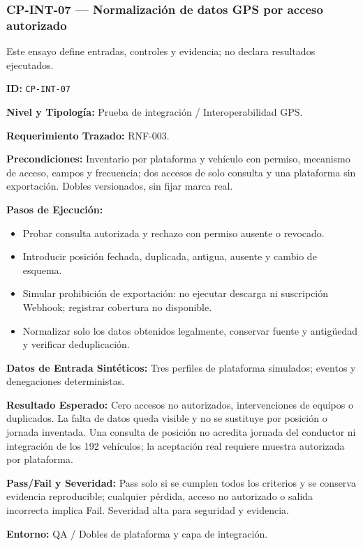 \subsubsection*{CP-INT-07 — Normalización de datos GPS por acceso autorizado}\label{sec:9-cp-int-07}

Este ensayo define entradas, controles y evidencia; no declara resultados ejecutados.

\par\noindent\textbf{ID:} \texttt{CP-\allowbreak{}INT-\allowbreak{}07}\par
\par\noindent\textbf{Nivel y Tipología:} Prueba de integración / Interoperabilidad GPS.\par
\par\noindent\textbf{Requerimiento Trazado:} RNF-003.\par
\par\noindent\textbf{Precondiciones:} Inventario por plataforma y vehículo con permiso, mecanismo de acceso, campos y frecuencia; dos accesos de solo consulta y una plataforma sin exportación. Dobles versionados, sin fijar marca real.\par
\par\noindent\textbf{Pasos de Ejecución:}\par
\begin{itemize}
\item Probar consulta autorizada y rechazo con permiso ausente o revocado.
\item Introducir posición fechada, duplicada, antigua, ausente y cambio de esquema.
\item Simular prohibición de exportación: no ejecutar descarga ni suscripción Webhook; registrar cobertura no disponible.
\item Normalizar solo los datos obtenidos legalmente, conservar fuente y antigüedad y verificar deduplicación.
\end{itemize}

\par\noindent\textbf{Datos de Entrada Sintéticos:} Tres perfiles de plataforma simulados; eventos y denegaciones deterministas.\par
\par\noindent\textbf{Resultado Esperado:} Cero accesos no autorizados, intervenciones de equipos o duplicados. La falta de datos queda visible y no se sustituye por posición o jornada inventada. Una consulta de posición no acredita jornada del conductor ni integración de los 192 vehículos; la aceptación real requiere muestra autorizada por plataforma.\par
\par\noindent\textbf{Pass/Fail y Severidad:} Pass solo si se cumplen todos los criterios y se conserva evidencia reproducible; cualquier pérdida, acceso no autorizado o salida incorrecta implica Fail. Severidad alta para seguridad y evidencia.\par
\par\noindent\textbf{Entorno:} QA / Dobles de plataforma y capa de integración.\par


